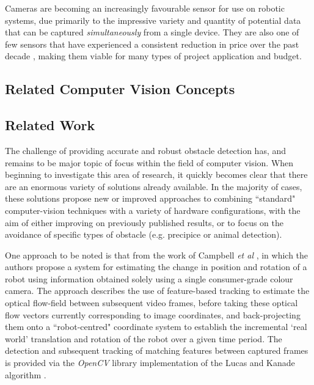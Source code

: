 Cameras are becoming an increasingly favourable sensor for use on robotic systems, due primarily to the impressive variety and quantity of potential data that can be captured \textit{simultaneously} from a single device. They are also one of few sensors that have experienced a consistent reduction in price over the past decade \cite{campbell}, making them viable for many types of project application and budget. 

\subsection{Related Computer Vision Concepts}

\subsection{Related Work}
\label{related-work}

The challenge of providing accurate and robust obstacle detection has, and remains to be major topic of focus within the field of computer vision. When beginning to investigate this area of research, it quickly becomes clear that there are an enormous variety of solutions already available. In the majority of cases, these solutions propose new or improved approaches to combining ``standard" computer-vision techniques with a variety of hardware configurations, with the aim of either improving on previously published results, or to focus on the avoidance of specific types of obstacle (e.g. precipice or animal detection). 



One approach to be noted is that from the work of Campbell \textit{et al} \cite{campbell}, in which the authors propose a system for estimating the change in position and rotation of a robot using information obtained solely using a single consumer-grade colour camera. The approach describes the use of feature-based tracking to estimate the optical flow-field between subsequent video frames, before taking these optical flow vectors currently corresponding to image coordinates, and back-projecting them onto a ``robot-centred" coordinate system to establish the incremental `real world' translation and rotation of the robot over a given time period. The detection and subsequent tracking of matching features between captured frames is provided via the \textit{OpenCV} library implementation of the Lucas and Kanade algorithm \cite{opencv-lucas-kanade-features}. 

